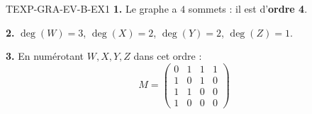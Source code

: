 %
\begin{corrige}{TEXP-GRA-EV-B-EX1}
\textbf{1.} Le graphe a $4$ sommets : il est d'\textbf{ordre 4}.

\textbf{2.} $\deg(W)=3$, $\deg(X)=2$, $\deg(Y)=2$, $\deg(Z)=1$.

\textbf{3.} En numérotant $W,X,Y,Z$ dans cet ordre :
$$M=\begin{pmatrix}0&1&1&1\\1&0&1&0\\1&1&0&0\\1&0&0&0\end{pmatrix}$$
\end{corrige}

